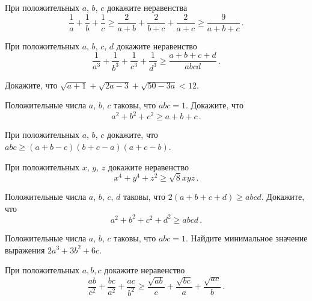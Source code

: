 \begin{problems}

\item 
При положительных $a$, $b$, $c$ докажите неравенства
\[
    \frac{1}{a} + \frac{1}{b} + \frac{1}{c}
\geq
    \frac{2}{a + b} + \frac{2}{b + c} + \frac{2}{a + c}
\geq
    \frac{9}{a + b + c}
\, . \]

\item
При положительных $a$, $b$, $c$, $d$ докажите неравенство
\[
    \frac{1}{a^3} + \frac{1}{b^3} + \frac{1}{c^3} + \frac{1}{d^3}
\geq
    \frac{a + b + c + d}{a b c d}
\, . \]

\item 
Докажите, что
\(
    \sqrt{a + 1} + \sqrt{2 a - 3} + \sqrt{50 - 3 a} < 12
\).

\item
Положительные числа $a$, $b$, $c$ таковы, что $a b c = 1$.
Докажите, что
\[
    a^2 + b^2 + c^2
\geq
    a + b + c
\, . \]

\item 
При положительных $a$, $b$, $c$ докажите, что
\(
    a b c \geq (a + b - c) (b + c - a) (a + c - b)
\).

\item 
При положительных $x$, $y$, $z$ докажите неравенство 
\[
    x^4 + y^4 + z^2 \geq \sqrt{8} x y z
\, . \]

\item 
Положительные числа $a$, $b$, $c$, $d$ таковы, что $2 (a + b + c + d) \geq a b c d$.
Докажите, что
\[
    a^2 + b^2 + c^2 + d^2
\geq
    abcd
\, . \]

\item 
Положительные числа $a$, $b$, $c$ таковы, что $a b c = 1$.
Найдите минимальное значение выражения $2 a^3 + 3 b^2 + 6 c$.


\item 
При положительных $a, b, c$ докажите неравенство
\[
    \frac{a b}{c^2} + \frac{b c}{a^2} + \frac{a c}{b^2}
\geq
    \frac{\sqrt{a b}} c + \frac{\sqrt{b c}} a + \frac{\sqrt{a c}} b
\, . \]

\end{problems}

